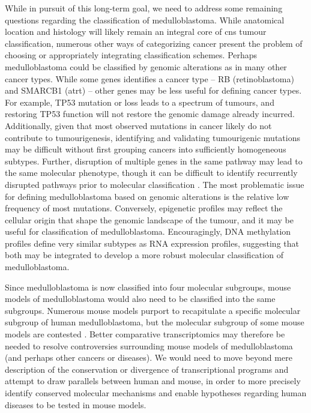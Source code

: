 While in pursuit of this long-term goal, we need to address some remaining questions regarding the classification of medulloblastoma. While anatomical location and histology will likely remain an integral core of \gls{cns} tumour classification, numerous other ways of categorizing cancer present the problem of choosing or appropriately integrating classification schemes. Perhaps medulloblastoma could be classified by genomic alterations as in many other cancer types. While some genes identifies a cancer type -- RB (retinoblastoma) and SMARCB1 (\gls{atrt}) -- other genes may be less useful for defining cancer types. For example, TP53 mutation or loss leads to a spectrum of tumours, and restoring TP53 function will not restore the genomic damage already incurred. Additionally, given that most observed mutations in cancer likely do not contribute to tumourigenesis, identifying and validating tumourigenic mutations may be difficult without first grouping cancers into sufficiently homogeneous subtypes. Further, disruption of multiple genes in the same pathway may lead to the same molecular phenotype, though it can be difficult to identify recurrently disrupted pathways prior to molecular classification . The most problematic issue for defining medulloblastoma based on genomic alterations is the relative low frequency of most mutations.  Conversely, epigenetic profiles may reflect the cellular origin that shape the genomic landscape of the tumour, and it may be useful for classification of medulloblastoma. Encouragingly, DNA methylation profiles define very similar subtypes as RNA expression profiles, suggesting that both may be integrated to develop a more robust molecular classification of medulloblastoma.

Since medulloblastoma is now classified into four molecular subgroups, mouse models of medulloblastoma would also need to be classified into the same subgroups. Numerous mouse models purport to recapitulate a specific molecular subgroup of human medulloblastoma,  but the molecular subgroup of some mouse models are contested . Better comparative transcriptomics may therefore be needed to resolve controversies surrounding mouse models of medulloblastoma (and perhaps other cancers or diseases). We would need to move beyond mere description of the conservation or divergence of transcriptional programs and  attempt to draw parallels between human and mouse, in order to more precisely identify conserved molecular mechanisms and enable hypotheses regarding human diseases to be tested in mouse models.

